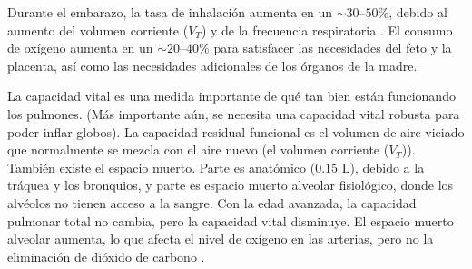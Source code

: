 \documentclass[12pt]{book}
\begin{document}
Durante el embarazo, la tasa de inhalación aumenta en un $\sim 30$--$50\%$, debido al aumento del volumen corriente ($V_T$) y de la frecuencia respiratoria \cite{19}. El consumo de oxígeno aumenta en un $\sim 20$--$40\%$ para satisfacer las necesidades del feto y la placenta, así como las necesidades adicionales de los órganos de la madre.

La capacidad vital es una medida importante de qué tan bien están funcionando los pulmones. (Más importante aún, se necesita una capacidad vital robusta para poder inflar globos). La capacidad residual funcional es el volumen de aire viciado que normalmente se mezcla con el aire nuevo (el volumen corriente ($V_T$)). También existe el espacio muerto. Parte es anatómico ($0.15\text{ L}$), debido a la tráquea y los bronquios, y parte es espacio muerto alveolar fisiológico, donde los alvéolos no tienen acceso a la sangre. Con la edad avanzada, la capacidad pulmonar total no cambia, pero la capacidad vital disminuye. El espacio muerto alveolar aumenta, lo que afecta el nivel de oxígeno en las arterias, pero no la eliminación de dióxido de carbono \cite{32, 37}.

\end{document}
